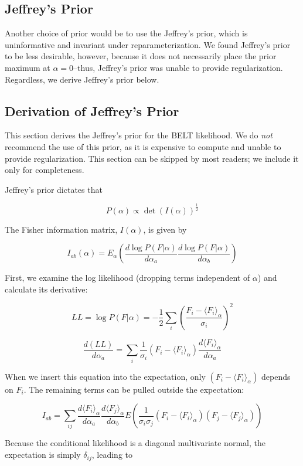 \documentclass[12pt]{article}
\begin{document}
\subsection*{Jeffrey's Prior}

Another choice of prior would be to use the Jeffrey's prior, which is uninformative and invariant under reparameterization.  We found Jeffrey's prior to be less desirable, however, because it does not necessarily place the prior maximum at $\alpha = 0$--thus, Jeffrey's prior was unable to provide regularization.  Regardless, we derive Jeffrey's prior below.

\subsection*{Derivation of Jeffrey's Prior}

This section derives the Jeffrey's prior for the BELT likelihood.  We do \emph{not} recommend the use of this prior, as it is expensive to compute and unable to provide regularization.  This section can be skipped by most readers; we include it only for completeness.

Jeffrey's prior dictates that 

$$P(\alpha) \propto \det(I(\alpha))^\frac{1}{2}$$

The Fisher information matrix, $I(\alpha)$, is given by

$$I_{ab}(\alpha) = E_\alpha(\frac{d\log P(F|\alpha)}{d\alpha_{a}}\frac{d\log P(F|\alpha)}{d\alpha_{b}})$$

First, we examine the log likelihood (dropping terms independent of $\alpha$) and calculate its derivative:

$$LL = \log P(F|\alpha) = - \frac{1}{2}\sum_i (\frac{F_i - \langle F_i\rangle_\alpha}{\sigma_i})^2$$

$$\frac{d(LL)}{d\alpha_a} = \sum_i \frac{1}{\sigma_i}(F_i - \langle F_i \rangle_\alpha) \frac{d\langle F_i \rangle_\alpha}{d\alpha_a}$$

When we insert this equation into the expectation, only $(F_i - \langle F_i \rangle_\alpha)$ depends on $F_i$.  The remaining terms can be pulled outside the expectation:

$$I_{ab} = \sum_{ij} \frac{d\langle F_i \rangle_\alpha}{d\alpha_a} \frac{d\langle F_j \rangle_\alpha}{d\alpha_b} E(\frac{1}{\sigma_i \sigma_j}(F_i - \langle F_i \rangle_\alpha)(F_j - \langle F_j \rangle_\alpha))$$

Because the conditional likelihood is a diagonal multivariate normal, the expectation is simply $\delta_{ij}$, leading to 
\end{document}
